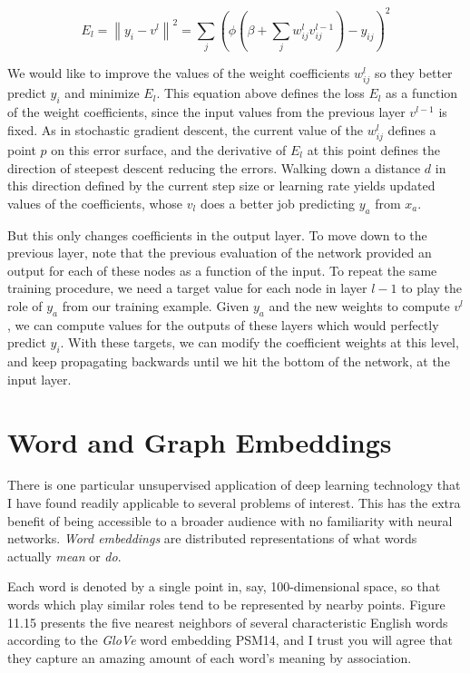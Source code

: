 \documentclass[10pt]{article}
\begin{document}
\begin{enumerate}
\[
E_{l}=\left\|y_{i}-v^{l}\right\|^{2}=\sum_{j}\left(\phi\left(\beta+\sum_{j} w_{ij}^{l} v_{ij}^{l-1}\right)-y_{ij}\right)^{2}
\]

We would like to improve the values of the weight coefficients $w_{ij}^{l}$ so they better predict $y_{i}$ and minimize $E_{l}$. This equation above defines the loss $E_{l}$ as a function of the weight coefficients, since the input values from the previous layer $v^{l-1}$ is fixed. As in stochastic gradient descent, the current value of the $w_{ij}^{l}$ defines a point $p$ on this error surface, and the derivative of $E_{l}$ at this point defines the direction of steepest descent reducing the errors. Walking down a distance $d$ in this direction defined by the current step size or learning rate yields updated values of the coefficients, whose $v_{l}$ does a better job predicting $y_{a}$ from $x_{a}$.

But this only changes coefficients in the output layer. To move down to the previous layer, note that the previous evaluation of the network provided an output for each of these nodes as a function of the input. To repeat the same training procedure, we need a target value for each node in layer $l-1$ to play the role of $y_{a}$ from our training example. Given $y_{a}$ and the new weights to compute $v^{l}$, we can compute values for the outputs of these layers which would perfectly predict $y_{i}$. With these targets, we can modify the coefficient weights at this level, and keep propagating backwards until we hit the bottom of the network, at the input layer.

\section{Word and Graph Embeddings}
There is one particular unsupervised application of deep learning technology that I have found readily applicable to several problems of interest. This has the extra benefit of being accessible to a broader audience with no familiarity with neural networks. \textit{Word embeddings} are distributed representations of what words actually \textit{mean} or \textit{do}.

Each word is denoted by a single point in, say, 100-dimensional space, so that words which play similar roles tend to be represented by nearby points. Figure 11.15 presents the five nearest neighbors of several characteristic English words according to the \textit{GloVe} word embedding PSM14, and I trust you will agree that they capture an amazing amount of each word's meaning by association.


\end{enumerate}
\end{document}
